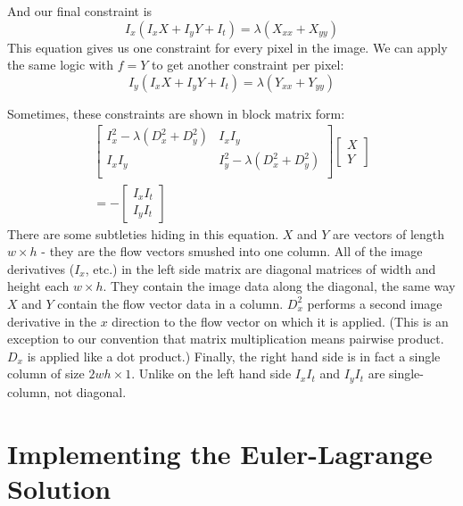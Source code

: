 \documentclass[10pt,twocolumn,letterpaper]{article}
\begin{document}
And our final constraint is
\begin{equation} \label{eq:eulerPlug6}
I_x (I_x X + I_y Y + I_t) = \lambda (X_{xx} + X_{yy})
\end{equation}
This equation gives us one constraint for every pixel in the image.  We can apply the same logic with $f=Y$ to get another constraint per pixel:
\begin{equation} \label{eq:eulerPlug7}
I_y (I_x X + I_y Y + I_t) = \lambda (Y_{xx} + Y_{yy})
\end{equation}

Sometimes, these constraints are shown in block matrix form:
\begin{multline} \label{eq:eulerBlock}
\left[ \begin{array}{cc}
I_x^2 - \lambda (D_x^2 + D_y^2) & I_x I_y\\
I_x I_y & I_y^2 - \lambda (D_x^2 + D_y^2) \\
\end{array} \right]
\left[\begin{array}{c}
X \\
Y
\end{array} \right] \\
=-\left[ \begin{array}{c}
I_x I_t \\
I_y I_t
\end{array} \right]
\end{multline}
There are some subtleties hiding in this equation.  $X$ and $Y$ are vectors of length $w \times h$ - they are the flow vectors smushed into one column.  All of the image derivatives ($I_x$, etc.) in the left side matrix are diagonal matrices of width and height each $w \times h$.  They contain the image data along the diagonal, the same way $X$ and $Y$ contain the flow vector data in a column.  $D_x^2$ performs a second image derivative in the $x$ direction to the flow vector on which it is applied.  (This is an exception to our convention that matrix multiplication means pairwise product.  $D_x$ is applied like a dot product.)  Finally, the right hand side is in fact a single column of size $2wh \times 1$.  Unlike on the left hand side $I_x I_t$ and $I_y I_t$ are single-column, not diagonal.

\section{Implementing the Euler-Lagrange Solution}
\end{document}
